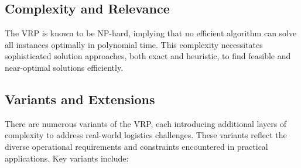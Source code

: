 \documentclass[
]{article}
\begin{document}
\subsection{Complexity and Relevance}
The VRP is known to be NP-hard, implying that no efficient algorithm can solve all instances optimally in polynomial time. This complexity necessitates sophisticated solution approaches, both exact and heuristic, to find feasible and near-optimal solutions efficiently.

\subsection{Variants and Extensions}
There are numerous variants of the VRP, each introducing additional layers of complexity to address real-world logistics challenges. These variants reflect the diverse operational requirements and constraints encountered in practical applications. Key variants include:
\end{document}
